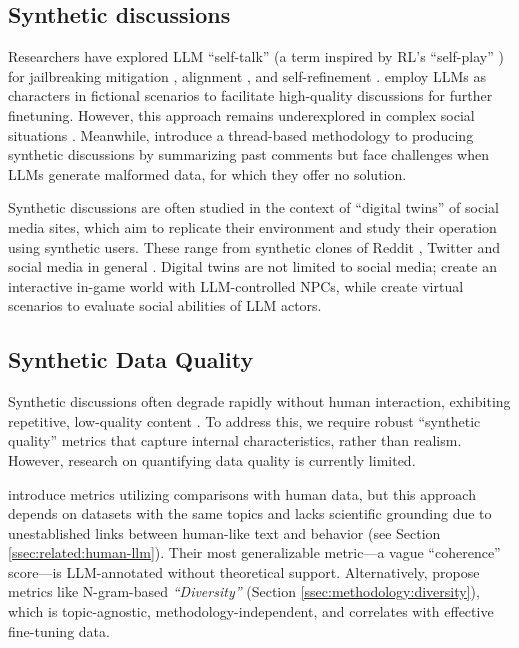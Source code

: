 \subsection{Synthetic discussions}
\label{ssec:related:discussions}


Researchers have explored \ac{LLM} “self-talk” (a term inspired by \acf{RL}'s “self-play” \citep{cheng-self-play}) for jailbreaking mitigation \cite{liu2024largelanguagemodelsagents, cheng-self-play}, alignment \cite{Bai2022ConstitutionalAH, collective_constitution}, and self-refinement \cite{Madaan2023SelfRefineIR, lambert2024}. \citet{ulmer2024} employ \acp{LLM} as characters in fictional scenarios to facilitate high-quality discussions for further finetuning. However, this approach remains underexplored in complex social situations \cite{zhou-etal-2024-real}. Meanwhile, \citet{balog_2024} introduce a thread-based methodology to producing synthetic discussions by summarizing past comments but face challenges when \acp{LLM} generate malformed data, for which they offer no solution.

Synthetic discussions are often studied in the context of “digital twins” of social media sites, which aim to replicate their environment and study their operation using synthetic users. These range from synthetic clones of Reddit \cite{park_simulacra}, Twitter \cite{mou_2024} and social media in general \cite{tornberg_2023, y_social}. Digital twins are not limited to social media; \citet{Park2023GenerativeAI} create an interactive in-game world with \ac{LLM}-controlled \acp{NPC}, while \citet{zhou_2024_sotopia} create virtual scenarios to evaluate social abilities of \ac{LLM} actors.  


\subsection{Synthetic Data Quality}

Synthetic discussions often degrade rapidly without human interaction, exhibiting repetitive, low-quality content \citep{ulmer2024}. To address this, we require robust “synthetic quality” metrics that capture internal characteristics, rather than realism. However, research on quantifying data quality is currently limited.

\citet{balog_2024} introduce metrics utilizing comparisons with human data, but this approach depends on datasets with the same topics and lacks scientific grounding due to unestablished links between human-like text and behavior (see Section \ref{ssec:related:human-llm}). Their most generalizable metric—a vague “coherence” score—is \ac{LLM}-annotated without theoretical support. Alternatively, \citet{ulmer2024} propose metrics like N-gram-based \textit{“Diversity”} (Section \ref{ssec:methodology:diversity}), which is topic-agnostic, methodology-independent, and correlates with effective fine-tuning data.


